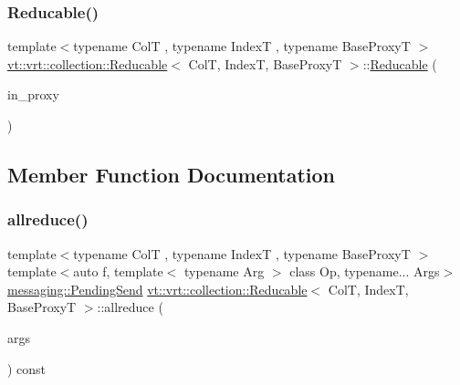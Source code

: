 \mbox{\label{structvt_1_1vrt_1_1collection_1_1_reducable_a658b587cdafda69c95ad0a2efe7a73fe}} 
\subsubsection{\texorpdfstring{Reducable()}{Reducable()}\hspace{0.1cm}{\footnotesize\ttfamily [4/4]}}
{\footnotesize\ttfamily template$<$typename ColT , typename IndexT , typename Base\+ProxyT $>$ \\
\hyperlink{structvt_1_1vrt_1_1collection_1_1_reducable}{vt\+::vrt\+::collection\+::\+Reducable}$<$ ColT, IndexT, Base\+ProxyT $>$\+::\hyperlink{structvt_1_1vrt_1_1collection_1_1_reducable}{Reducable} (\begin{DoxyParamCaption}\item[{\hyperlink{namespacevt_a1b417dd5d684f045bb58a0ede70045ac}{Virtual\+Proxy\+Type} const}]{in\+\_\+proxy }\end{DoxyParamCaption})\hspace{0.3cm}{\ttfamily [explicit]}}



\subsection{Member Function Documentation}
\mbox{\label{structvt_1_1vrt_1_1collection_1_1_reducable_ad142a161c01dd963164d767233ec417d}} 
\subsubsection{\texorpdfstring{allreduce()}{allreduce()}}
{\footnotesize\ttfamily template$<$typename ColT , typename IndexT , typename Base\+ProxyT $>$ \\
template$<$auto f, template$<$ typename Arg $>$ class Op, typename... Args$>$ \\
\hyperlink{structvt_1_1messaging_1_1_pending_send}{messaging\+::\+Pending\+Send} \hyperlink{structvt_1_1vrt_1_1collection_1_1_reducable}{vt\+::vrt\+::collection\+::\+Reducable}$<$ ColT, IndexT, Base\+ProxyT $>$\+::allreduce (\begin{DoxyParamCaption}\item[{Args \&\&...}]{args }\end{DoxyParamCaption}) const}



